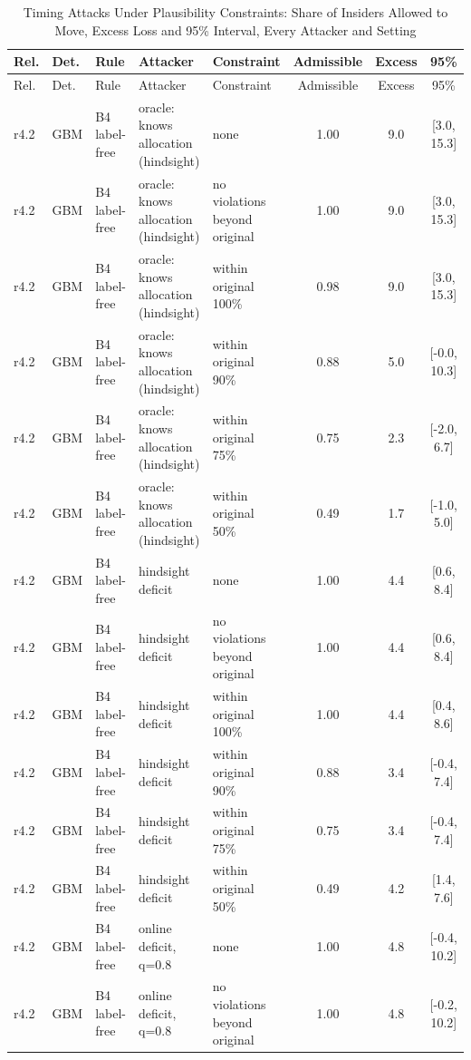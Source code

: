 \begin{longtable}{lllp{4.2cm}p{3.4cm}ccc}
\caption{Timing Attacks Under Plausibility Constraints: Share of Insiders Allowed to Move, Excess Loss and 95\% Interval, Every Attacker and Setting\label{tab:e-m1-constrained}}\\
\toprule
Rel. & Det. & Rule & Attacker & Constraint & Admissible & Excess & 95\% \\
\midrule
\endfirsthead
\toprule
Rel. & Det. & Rule & Attacker & Constraint & Admissible & Excess & 95\% \\
\midrule
\endhead
r4.2 & GBM & B4 label-free & oracle: knows allocation (hindsight) & none & 1.00 & 9.0 & [3.0, 15.3] \\
r4.2 & GBM & B4 label-free & oracle: knows allocation (hindsight) & no violations beyond original & 1.00 & 9.0 & [3.0, 15.3] \\
r4.2 & GBM & B4 label-free & oracle: knows allocation (hindsight) & within original 100\% & 0.98 & 9.0 & [3.0, 15.3] \\
r4.2 & GBM & B4 label-free & oracle: knows allocation (hindsight) & within original 90\% & 0.88 & 5.0 & [-0.0, 10.3] \\
r4.2 & GBM & B4 label-free & oracle: knows allocation (hindsight) & within original 75\% & 0.75 & 2.3 & [-2.0, 6.7] \\
r4.2 & GBM & B4 label-free & oracle: knows allocation (hindsight) & within original 50\% & 0.49 & 1.7 & [-1.0, 5.0] \\
r4.2 & GBM & B4 label-free & hindsight deficit & none & 1.00 & 4.4 & [0.6, 8.4] \\
r4.2 & GBM & B4 label-free & hindsight deficit & no violations beyond original & 1.00 & 4.4 & [0.6, 8.4] \\
r4.2 & GBM & B4 label-free & hindsight deficit & within original 100\% & 1.00 & 4.4 & [0.4, 8.6] \\
r4.2 & GBM & B4 label-free & hindsight deficit & within original 90\% & 0.88 & 3.4 & [-0.4, 7.4] \\
r4.2 & GBM & B4 label-free & hindsight deficit & within original 75\% & 0.75 & 3.4 & [-0.4, 7.4] \\
r4.2 & GBM & B4 label-free & hindsight deficit & within original 50\% & 0.49 & 4.2 & [1.4, 7.6] \\
r4.2 & GBM & B4 label-free & online deficit, q=0.8 & none & 1.00 & 4.8 & [-0.4, 10.2] \\
r4.2 & GBM & B4 label-free & online deficit, q=0.8 & no violations beyond original & 1.00 & 4.8 & [-0.2, 10.2] \\

\end{longtable}
